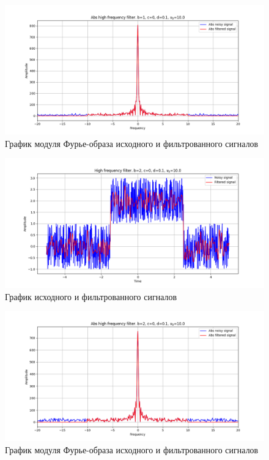 \documentclass[a4paper, 16pt]{article}
\begin{document}
    \begin{figure}[!htb]
        \centering
        \includegraphics[scale=0.485]{2_abs_u_U_nohigh.png}
        \captionsetup{skip=0pt}
        \caption{График модуля Фурье-образа исходного и фильтрованного сигналов}
        \label{fig:fig4}
    \end{figure}
    \newpage
    \begin{figure}[!htb]
        \centering
        \includegraphics[scale=0.485]{3_u_flt_u_nohigh.png}
        \captionsetup{skip=0pt}
        \caption{График исходного и фильтрованного сигналов}
        \label{fig:fig5}
    \end{figure}
    \begin{figure}[!htb]
        \centering
        \includegraphics[scale=0.485]{3_abs_u_U_nohigh.png}
        \captionsetup{skip=0pt}
        \caption{График модуля Фурье-образа исходного и фильтрованного сигналов}
        \label{fig:fig6}
    \end{figure}
\end{document}
